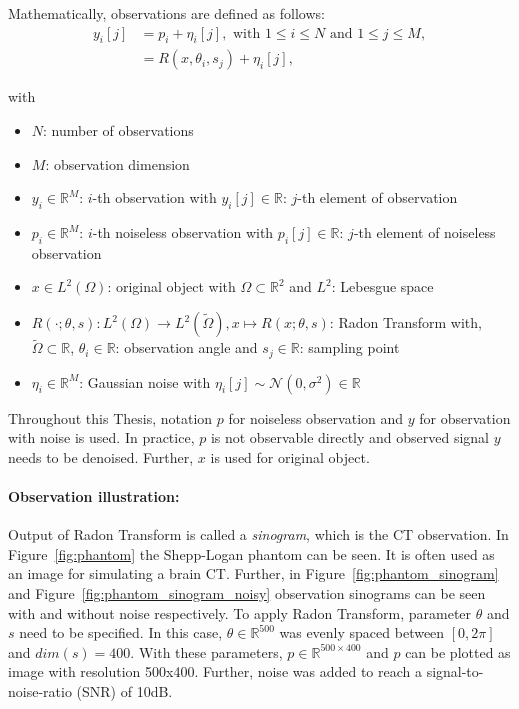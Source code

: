 Mathematically, observations are defined as follows:
\begin{equation}
    \label{eq:2Dreconstruction}
    \begin{aligned}
        y_i[j] &= p_i + \eta_i[j] , \text{ with } 1 \leq i \leq N \text{ and } 1 \leq j \leq M, \\
               &= R(x, \theta_i, s_j) + \eta_i[j],
    \end{aligned}
\end{equation}

with
\begin{itemize}
    \item $N$: number of observations
    \item $M$: observation dimension
    \item $y_i \in \mathbb{R}^M$:  $i$-th observation with $y_i[j] \in \mathbb{R}$: $j$-th element of observation
    \item $p_i \in \mathbb{R}^M$:  $i$-th noiseless observation with $p_i[j] \in \mathbb{R}$: $j$-th element of noiseless observation
    \item $x \in L^2(\Omega)$: original object with $\Omega \subset \mathbb{R}^2 $ and $L^2$: Lebesgue space
    \item $R(\cdot; \theta, s): L^2(\Omega) \to L^2(\tilde{\Omega}) , x \mapsto R(x; \theta,s)$: Radon Transform \cite{radonTransform} with,\\
        $\tilde{\Omega} \subset \mathbb{R}$, $\theta_i \in \mathbb{R}$: observation angle and $s_j \in \mathbb{R}$: sampling point 
    \item $\eta_i \in \mathbb{R}^M$: Gaussian noise with $\eta_i[j] \sim \mathcal{N}(0,\sigma^2) \in \mathbb{R}$
\end{itemize}

\begin{tcolorbox}[colback=red!5!white,colframe=red!75!black]
    Throughout this Thesis, notation $p$ for noiseless observation and $y$ for observation with noise is used.
    In practice, $p$ is not observable directly and observed signal $y$ needs to be denoised.
    Further, $x$ is used for original object.
\end{tcolorbox}

\paragraph{Observation illustration:}

Output of Radon Transform is called a \textit{sinogram}, which is the CT observation.
In Figure~\ref{fig:phantom} the Shepp-Logan phantom can be seen.
It is often used as an image for simulating a brain CT.
Further, in Figure~\ref{fig:phantom_sinogram} and Figure~\ref{fig:phantom_sinogram_noisy} 
observation sinograms can be seen with and without noise respectively. 
To apply Radon Transform, parameter $\theta$ and $s$ need to be specified.
In this case, $\theta \in \mathbb{R}^{500}$ was evenly spaced
between $[0, 2 \pi]$ and $dim(s) = 400$. 
With these parameters, $p \in \mathbb{R}^{500 \times 400}$ and $p$ can be plotted as image with resolution 500x400. 
Further, noise was added to reach a signal-to-noise-ratio (SNR) of 10dB.

